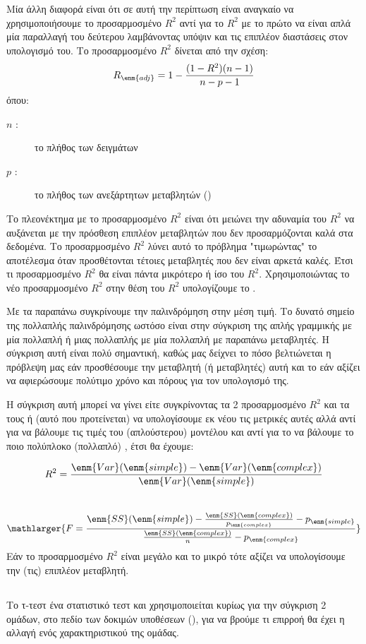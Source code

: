 Μία άλλη
διαφορά είναι ότι σε αυτή την περίπτωση είναι αναγκαίο να χρησιμοποιήσουμε το
προσαρμοσμένο $R^2$ αντί για το $R^2$ με το πρώτο να είναι απλά μία παραλλαγή του δεύτερου
λαμβάνοντας υπόψιν και τις επιπλέον διαστάσεις στον υπολογισμό του. Το προσαρμοσμένο
$R^2$ δίνεται από την σχέση:
$$R_{\enm{adj}}=1-\frac{(1-R^2)(n-1)}{n-p-1}$$
όπου:
\begin{description}
    \item[$n$ :] το πλήθος των δειγμάτων
    \item[$p$ :] το πλήθος των ανεξάρτητων μεταβλητών ()
\end{description}
Το πλεονέκτημα με το προσαρμοσμένο $R^2$
είναι ότι μειώνει την αδυναμία του $R^2$
να
αυξάνεται με την πρόσθεση επιπλέον μεταβλητών που δεν προσαρμόζονται καλά στα
δεδομένα. Το προσαρμοσμένο $R^2$
λύνει αυτό το πρόβλημα "τιμωρώντας" το αποτέλεσμα
όταν προσθέτονται τέτοιες μεταβλητές που δεν είναι αρκετά καλές. Έτσι τι προσαρμοσμένο $R^2$
θα είναι πάντα μικρότερο ή ίσο του $R^2$. Χρησιμοποιώντας το νέο προσαρμοσμένο $R^2$ στην
θέση του $R^2$ υπολογίζουμε το .

Με τα παραπάνω συγκρίνουμε την παλινδρόμηση στην μέση τιμή. Το δυνατό σημείο της
πολλαπλής παλινδρόμησης ωστόσο είναι στην σύγκριση της απλής γραμμικής με μία
πολλαπλή ή μιας πολλαπλής με μία πολλαπλή με παραπάνω μεταβλητές. Η σύγκριση αυτή
είναι πολύ σημαντική, καθώς μας δείχνει το πόσο βελτιώνεται η πρόβλεψη μας εάν
προσθέσουμε την μεταβλητή (ή μεταβλητές) αυτή και το εάν αξίζει να αφιερώσουμε
πολύτιμο χρόνο και πόρους για τον υπολογισμό της.

Η σύγκριση αυτή μπορεί να γίνει είτε
συγκρίνοντας τα 2 προσαρμοσμένο $R^2$
και τα  τους ή (αυτό που προτείνεται) να
υπολογίσουμε εκ νέου τις μετρικές αυτές αλλά αντί για  να βάλουμε τις τιμές του 
(απλούστερου) μοντέλου και αντί για το  να βάλουμε το ποιο πολύπλοκο (πολλαπλό) , έτσι
θα έχουμε:

$$R^2=\frac{\enm{Var}(\enm{simple})-\enm{Var}(\enm{complex})}{\enm{Var}(\enm{simple})}$$
\\
$$\mathlarger{F =\frac{\enm{SS}(\enm{simple}) - \frac{\enm{SS}(\enm{complex})}{p_{\enm{complex}}} - p_{\enm{simple}}} {\frac{\enm{SS}(\enm{complex})}{n} - p_{\enm{complex}}}}$$
Εάν το προσαρμοσμένο $R^2$
είναι μεγάλο και το  μικρό τότε αξίζει να υπολογίσουμε την
(τις) επιπλέον μεταβλητή.
\subsection{}
Το τ-τεστ ένα στατιστικό τεστ και χρησιμοποιείται κυρίως για την σύγκριση 2 ομάδων, στο
πεδίο των δοκιμών υποθέσεων (), για να βρούμε τι επιρροή θα έχει η
αλλαγή ενός χαρακτηριστικού της ομάδας.

